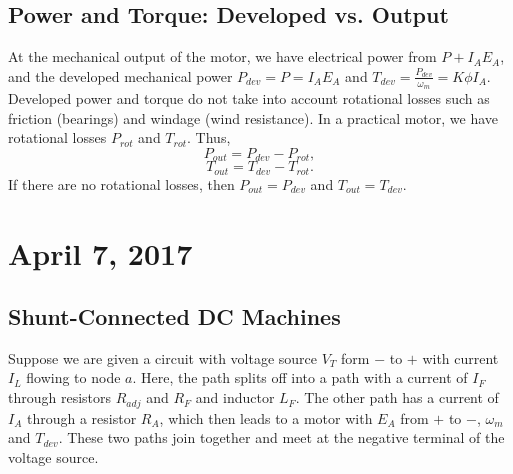 \documentclass[11pt]{article}
\theoremstyle{plain} %
\theoremstyle{definition}
\theoremstyle{example}
\theoremstyle{remark}
\begin{document}
\subsection{Power and Torque: Developed vs. Output}
At the mechanical output of the motor, we have electrical power from $P + I_AE_A$, and the developed mechanical power $P_{dev} = P =I_AE_A$ and $T_{dev} = \frac{P_{dev}}{\omega_m} = K\phi I_A$. Developed power and torque do not take into account rotational losses such as friction (bearings) and windage (wind resistance). In a practical motor, we have 
rotational losses $P_{rot}$ and $T_{rot}$. Thus, 
$$P_{out} = P_{dev}-P_{rot},$$
$$T_{out} = T_{dev}-T_{rot}.$$
If there are no rotational losses, then $P_{out} = P_{dev}$ and $T_{out} = T_{dev}$. 

\section{April 7, 2017}
\subsection{Shunt-Connected DC Machines}
Suppose we are given a circuit with voltage source $V_T$ form $-$ to $+$ with current $I_L$ flowing to node $a$. Here, the path splits off into a path with a current of $I_F$ through resistors $R_{adj}$ and $R_F$ and inductor $L_F$. The other path has a current of $I_A$ through a resistor $R_A$, which then leads to a motor with $E_A$ from $+$ to $-$, $\omega_m$ and $T_{dev}$. These two paths join together and meet at the negative terminal of the voltage source. 
\end{document}
